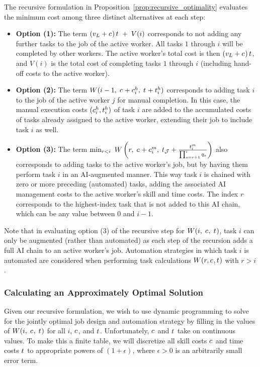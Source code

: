 \documentclass{article}
\theoremstyle{plain}
\theoremstyle{plain}
\begin{document}
The recursive formulation in Proposition~\ref{prop:recursive_optimality} evaluates the minimum cost among three distinct alternatives at each step:
\begin{itemize}
    \item \textbf{Option (1):} The term $\left(v_L + c_{}\right) t_{} \; + \; V(i)$ corresponds to not adding any further tasks to the job of the active worker.  All tasks $1$ through $i$ will be completed by other workers. 
    The active worker's total cost is then $\left(v_L + c_{}\right) t_{}$, and $V(i)$ is the total cost of completing tasks $1$ through $i$ (including hand-off costs to the active worker).

    \item \textbf{Option (2):} The term $W(i-1,\; c_{} + c^{h}_{i},\; t_{} + t^{h}_{i})$ corresponds to adding task $i$ to the job of the active worker $j$ for manual completion.
    In this case, the manual execution costs $(c^{h}_{i}, t^{h}_{i})$ of task $i$ are added to the accumulated costs of tasks already assigned to the active worker, extending their job to include task $i$ as well.

    \item \textbf{Option (3):} The term $\min_{r < i} \ W\left(r,\; c_{} + c^{m}_{i},\; t_{\mathcal{J}} + \frac{t^{m}_{i}}{\prod_{s=r+1}^{i} q_s}\right)$ also corresponds to adding tasks to the active worker's job, but by having them perform task $i$ in an AI-augmented manner. 
    This way task $i$ is chained with zero or more preceding (automated) tasks, adding the associated AI management costs to the active worker's skill and time costs.  The index $r$ corresponds to the highest-index task that is not added to this AI chain, which can be any value between $0$ and $i-1$.
\end{itemize}
Note that in evaluating option (3) of the recursive step for $W(i,\; c_{},\; t_{})$, task $i$ can only be augmented (rather than automated) as each step of the recursion adds a full AI chain to an active worker's job.
Automation strategies in which task $i$ is automated are considered when performing task calculations $W(r, c_{}, t_{})$ with $r > i$.


\subsubsection{Calculating an Approximately Optimal Solution}
\label{sec:DP_approximation}
Given our recursive formulation, we wish to use dynamic programming to solve for the jointly optimal job design and automation strategy by filling in the values of $W(i,\; c_{},\; t_{})$ for all $i$, $c_{}$, and $t_{}$.  Unfortunately, $c_{}$ and $t_{}$ take on continuous values.  To make this a finite table, we will discretize all skill costs $c_{}$ and time costs $t_{}$ to appropriate powers of $(1+\epsilon)$, where $\epsilon > 0$ is an arbitrarily small error term.
\end{document}
